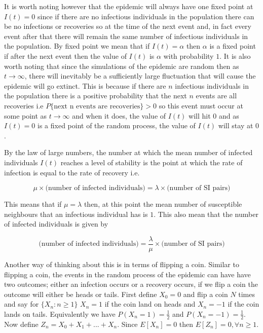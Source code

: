 \documentclass{uonmathsreport}
\begin{document}
It is worth noting however that the epidemic will always have one fixed point at $I(t)=0$ since if there are no infectious individuals in the population there can be no infections or recoveries so at the time of the next event and, in fact every event after that there will remain the same number of infectious individuals in the population. By fixed point we mean that if $I(t)=\alpha$ then $\alpha$ is a fixed point if after the next event then the value of $I(t)$ is $\alpha$ with probability $1$. It is also worth noting that since the simulations of the epidemic are random then as $t \rightarrow \infty$, there will inevitably be a sufficiently large fluctuation that will cause the epidemic will go extinct. This is because if there are $n$ infectious individuals in the population there is a positive probability that the next $n$  events are all recoveries i.e $P\{\mbox{next n events are recoveries}\}>0$ so this event must occur at some point as $t \rightarrow \infty$ and when it does, the value of $I(t)$ will hit $0$ and as $I(t)=0$ is a fixed point of the random process, the value of $I(t)$ will stay at $0$. 

By the law of large numbers, the number at which the mean number of infected individuals $I(t)$ reaches a level of stability is the point at which the rate of infection is equal to the rate of recovery i.e.

\begin{equation}\label{equilibrium}
\mu\times\mbox{(number of infected individuals)}=\lambda\times\mbox{(number of SI pairs)}
\end{equation}

This means that if $\mu=\lambda$ then, at this point the mean number of susceptible neighbours that an infectious individual has is $1$. This also mean that the number of infected individuals is given by

\begin{equation}
\mbox{(number of infected individuals)}=\frac{\lambda}{\mu}\times\mbox{(number of SI pairs)}
\end{equation}

Another way of thinking about this is in terms of flipping a coin. Similar to flipping a coin, the events in the random process of the epidemic can have have two outcomes; either an infection occurs or a recovery occurs, if we flip a coin the outcome will either be heads or tails. First define $X_0=0$ and flip a coin $N$ times and say for $\{X_n:n\geq1\}$ $X_n=1$ if the coin land on heads and $X_n=-1$ if the coin lands on tails. Equivalently we have $P(X_n=1)=\frac{1}{2}$ and $P(X_n=-1)=\frac{1}{2}$. Now define $Z_n=X_0+X_1+...+X_n$. Since $E[X_n]=0$ then $E[Z_n]=0, \forall n\geq 1$. 
\end{document}
